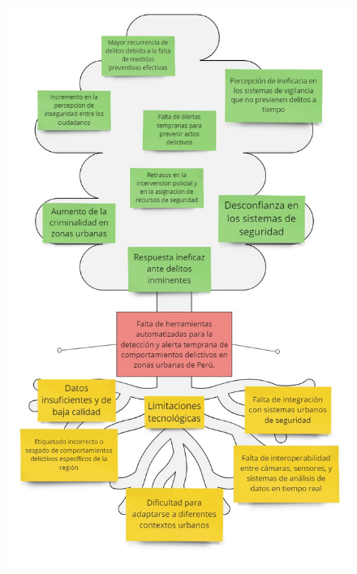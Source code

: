	\begin{figure}[h]
		\begin{center}
			\includegraphics[width=1.00\textwidth]{anexos/Problem Tree Template (1).jpg}
		\end{center}
	\end{figure}
	\clearpage
	

